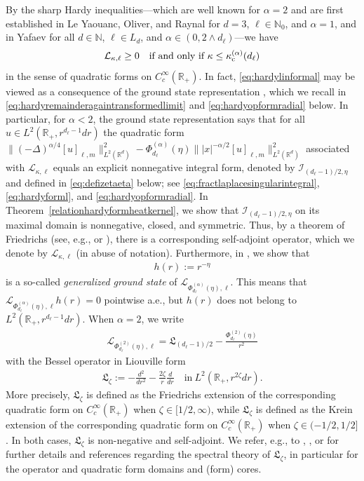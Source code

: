 \documentclass[12pt,reqno]{amsart}
\theoremstyle{definition}
\theoremstyle{remark}
\numberwithin{equation}{section}
\newcommand{\1}{\mathbbm{1}}
\newcommand{\N}{\mathbb{N}}
\newcommand{\R}{\mathbb{R}}
\def\ci{\mathcal{I}}
\def\cl{\mathcal{L}}
\def\fl{\mathfrak{L}}
\begin{document}
By the sharp Hardy inequalities---which are well known for $\alpha=2$ and are first established in Le Yaouanc, Oliver, and Raynal \cite{LeYaouancetal1997} for $d=3$, $\ell\in\N_0$, and $\alpha=1$, and in Yafaev \cite{Yafaev1999} for all $d\in\N$, $\ell\in L_d$, and $\alpha\in(0,2\wedge d_\ell)$---we have
\begin{align}
  \label{eq:hardylinformal}
  \cl_{\kappa,\ell} \geq0 \quad \text{if and only if}\ \kappa\leq\kappa_{\rm c}^{(\alpha)}(d_\ell)
\end{align}
in the sense of quadratic forms on $C_c^\infty(\R_+)$. In fact, \eqref{eq:hardylinformal} may be viewed as a consequence of the ground state representation \cite{BogdanMerz2024}, which we recall in \eqref{eq:hardyremainderagaintransformedlimit} and \eqref{eq:hardyopformradial} below. 
In particular, for $\alpha<2$, the ground state representation says that for all $u\in L^2(\R_+,r^{d_\ell-1}dr)$ the quadratic form $\|(-\Delta)^{\alpha/4}[u]_{\ell,m}\|_{L^2(\R^d)}^2-\Phi_{d_\ell}^{(\alpha)}(\eta)\||x|^{-\alpha/2}[u]_{\ell,m}\|_{L^2(\R^d)}^2$ associated with $\cl_{\kappa,\ell}$ equals an explicit nonnegative integral form, denoted by $\ci_{(d_\ell-1)/2,\eta}$ and defined in \eqref{eq:defizetaeta} below; see \eqref{eq:fractlaplacesingularintegral}, \eqref{eq:hardyforml}, and \eqref{eq:hardyopformradial}. In Theorem~\ref{relationhardyformheatkernel}, we show that $\ci_{(d_\ell-1)/2,\eta}$ on its maximal domain is nonnegative, closed, and symmetric. Thus, by a theorem of Friedrichs (see, e.g., \cite[Theorem~VI.2.1]{Kato1966} or \cite[Theorem~1.3.1]{Fukushimaetal2011}), there is a corresponding self-adjoint operator, which we denote by $\cl_{\kappa,\ell}$ (in abuse of notation).
Furthermore, in \cite{BogdanMerz2024}, we show that
\begin{align}
  \label{eq:defh}
  h(r) := r^{-\eta}  
\end{align}
is a so-called \textit{generalized ground state} of $\cl_{\Phi_{d_\ell}^{(\alpha)}(\eta),\ell}$. This means that $\cl_{\Phi_{d_\ell}^{(\alpha)}(\eta),\ell}h(r)=0$ pointwise a.e., but $h(r)$ does not belong to $L^2(\R_+,r^{d_\ell-1}dr)$. 
%
When $\alpha=2$, we write
\begin{align}
  \cl_{\Phi_{d_\ell}^{(2)}(\eta),\ell} = \fl_{(d_\ell-1)/2} - \frac{\Phi_{d_\ell}^{(2)}(\eta)}{r^2}
\end{align}
with the Bessel operator in Liouville form
\begin{align}
  \label{eq:deflzeta}
  \fl_\zeta := -\frac{d^2}{dr^2} - \frac{2\zeta}{r}\frac{d}{dr}
  \quad \text{in} \ L^2(\R_+,r^{2\zeta}dr).
\end{align}\index{$\fl_\zeta$}More precisely, $\fl_\zeta$ is defined as the Friedrichs extension of the corresponding quadratic form on $C_c^\infty(\R_+)$ when $\zeta\in[1/2,\infty)$, while $\fl_\zeta$ is defined as the Krein extension of the corresponding quadratic form on $C_c^\infty(\R_+)$ when $\zeta\in(-1/2,1/2]$. In both cases, $\fl_\zeta$ is non-negative and self-adjoint. We refer, e.g., to \cite[Theorem~4.22]{Bruneauetal2011}, \cite[Theorem~8.4]{DerezinskiGeorgescu2021}, or \cite[Section~4]{Metafuneetal2018} for further details and references regarding the spectral theory of $\fl_\zeta$, in particular for the operator and quadratic form domains and (form) cores.
\end{document}
